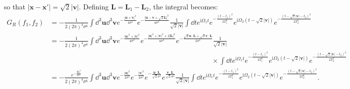 \documentclass[letterpaper,12pt,titlepage,oneside,final]{book}
\newcommand{\ii}{\mathrm{i}}
\begin{document}
so that $|\bm x - \bm x'| = \sqrt{2} |\bm v|$. Defining $\bm L = \bm L_1 - \bm L_2$, the integral becomes:{\footnotesize
\begin{align}
    G_R(f_1,f_2) & = -\frac{1}{2(2\pi)^4 \sigma^6} \int \dd^3\bm u \dd^3 \bm v e^{- \frac{|\bm u + \bm v|^2}{4\sigma^2}}e^{- \frac{|\bm u - \bm v + \sqrt{2}\bm L|^2}{4\sigma^2}}\frac{1}{\sqrt{2}|\bm v|} \int \dd t e^{\ii \Omega_1 t} e^{- \frac{(t-t_1)^2}{2T_1^2}}e^{\ii \Omega_2 (t - \sqrt{2}|\bm v|)} e^{- \frac{(t - \sqrt{2}|\bm v|-t_2)^2}{2T_2^2}}\\
    & = -\frac{1}{2(2\pi)^4 \sigma^6} \int   \dd^3\bm u \dd^3 \bm v e^{- \frac{|\bm u|^2 + |\bm v|^2}{4\sigma^2}}e^{- \frac{|\bm u|^2 +|\bm v|^2 + 2|\bm L|^2}{4\sigma^2}}e^{-\frac{\sqrt{2}\bm u\cdot \bm L + \sqrt{2}\bm v \cdot \bm L}{2\sigma^2}} \frac{1}{\sqrt{2}|\bm v|} \nonumber\\
    &\:\:\:\:\:\:\:\:\:\:\:\:\:\:\:\:\:\:\:\:\:\:\:\:\:\:\:\:\:\:\:\:\:\:\:\:\:\:\:\:\:\:\:\:\:\:\:\:\:\:\:\:\:\:\:\:\:\:\:\:\:\:\:\:\:\:\:\:\:\:\:\:\:\:\:\:\:\:\:\:\:\:\:\:\:\:\:\:\:\:\:\:\:\:\:\:\:\:\:\:\:\:\:\:\:\times\int \dd t e^{\ii \Omega_1 t} e^{- \frac{(t-t_1)^2}{2T_1^2}}e^{\ii \Omega_2 (t - \sqrt{2}|\bm v|)} e^{- \frac{(t - \sqrt{2}|\bm v|-t_2)^2}{2T_2^2}}\nonumber\\
    &= -\frac{e^{- \frac{|\bm L|^2}{2\sigma^2}}}{2(2\pi)^4 \sigma^6} \int   \dd^3\bm u \dd^3 \bm v e^{-\frac{|\bm u|^2}{2\sigma^2}}e^{-\frac{|\bm v|^2}{2\sigma^2}} e^{-\frac{\bm u\cdot \bm L}{\sqrt{2}\sigma^2}}e^{\frac{\bm v \cdot \bm L}{\sqrt{2}\sigma^2}}\frac{1}{\sqrt{2}|\bm v|} \int \dd t e^{\ii \Omega_1 t} e^{- \frac{(t-t_1)^2}{2T_1^2}}e^{\ii \Omega_2 (t - \sqrt{2}|\bm v|)} e^{- \frac{(t - \sqrt{2}|\bm v|-t_2)^2}{2T_2^2}}.\nonumber
\end{align}}
\end{document}
